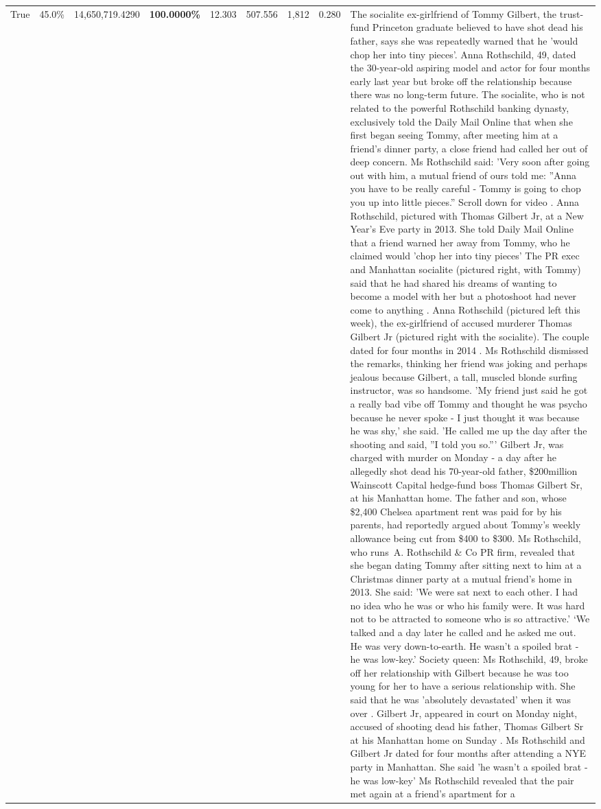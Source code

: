 \begin{table}[H]
\begin{tabular}{lllrlllll}
True & 45.0\% & 14,650,719.4290 & \bfseries \color{red} 100.0000\% & 12.303 & 507.556 & 1,812 & 0.280 & The socialite ex-girlfriend of Tommy Gilbert, the trust-fund Princeton graduate believed to have shot dead his father, says she was repeatedly warned that he 'would chop her into tiny pieces'. Anna Rothschild, 49, dated the 30-year-old aspiring model and actor for four months early last year but broke off the relationship because there was no long-term future. The socialite, who is not related to the powerful Rothschild banking dynasty, exclusively told the Daily Mail Online that when she first began seeing Tommy, after meeting him at a friend's dinner party, a close friend had called her out of deep concern. Ms Rothschild said: 'Very soon after going out with him, a mutual friend of ours told me: ''Anna you have to be really careful - Tommy is going to chop you up into little pieces.'' Scroll down for video . Anna Rothschild, pictured with Thomas Gilbert Jr, at a New Year's Eve party in 2013. She told Daily Mail Online that a friend warned her away from Tommy, who he claimed would 'chop her into tiny pieces' The PR exec and Manhattan socialite (pictured right, with Tommy) said that he had shared his dreams of wanting to become a model with her but a photoshoot had never come to anything . Anna Rothschild (pictured left this week), the ex-girlfriend of accused murderer Thomas Gilbert Jr (pictured right with the socialite). The couple dated for four months in 2014 . Ms Rothschild dismissed the remarks, thinking her friend was joking and perhaps jealous because Gilbert, a tall, muscled blonde surfing instructor, was so handsome. 'My friend just said he got a really bad vibe off Tommy and thought he was psycho because he never spoke - I just thought it was because he was shy,' she said. 'He called me up the day after the shooting and said, ''I told you so.''' Gilbert Jr, was charged with murder on Monday - a day after he allegedly shot dead his 70-year-old father, \$200million Wainscott Capital hedge-fund boss Thomas Gilbert Sr, at his Manhattan home. The father and son, whose \$2,400 Chelsea apartment rent was paid for by his parents, had reportedly argued about Tommy's weekly allowance being cut from \$400 to \$300. Ms Rothschild, who runs A. Rothschild \& Co PR firm, revealed that she began dating Tommy after sitting next to him at a Christmas dinner party at a mutual friend's home in 2013. She said: 'We were sat next to each other. I had no idea who he was or who his family were. It was hard not to be attracted to someone who is so attractive.' ‘We talked and a day later he called and he asked me out. He was very down-to-earth. He wasn’t a spoiled brat - he was low-key.’ Society queen: Ms Rothschild, 49, broke off her relationship with Gilbert because he was too young for her to have a serious relationship with. She said that he was 'absolutely devastated' when it was over . Gilbert Jr, appeared in court on Monday night, accused of shooting dead his father, Thomas Gilbert Sr at his Manhattan home on Sunday . Ms Rothschild and Gilbert Jr dated for four months after attending a NYE party in Manhattan. She said 'he wasn't a spoiled brat - he was low-key' Ms Rothschild revealed that the pair met again at a friend’s apartment for a 
\end{tabular}
\end{table}
